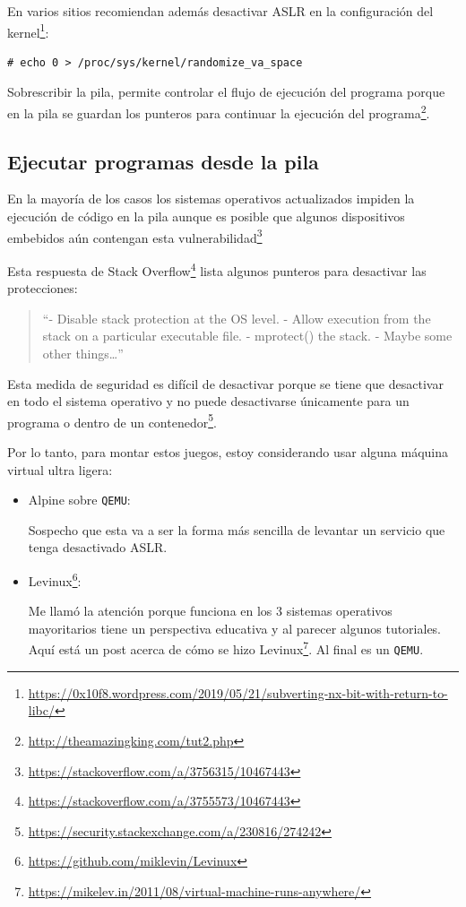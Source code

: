 \documentclass[
  12,
]{scrartcl}
\DeclareRobustCommand{\href}[2]{#2\footnote{\url{#1}}}
\begin{document}
En varios sitios recomiendan además
\href{https://0x10f8.wordpress.com/2019/05/21/subverting-nx-bit-with-return-to-libc/}{desactivar
ASLR en la configuración del kernel}:

\begin{verbatim}
# echo 0 > /proc/sys/kernel/randomize_va_space
\end{verbatim}

Sobrescribir la pila, permite controlar el flujo de ejecución del
programa porque \href{http://theamazingking.com/tut2.php}{en la pila se
guardan los punteros para continuar la ejecución del programa}.

\hypertarget{ejecutar-programas-desde-la-pila}{%
\subsection{Ejecutar programas desde la
pila}\label{ejecutar-programas-desde-la-pila}}

En la mayoría de los casos los sistemas operativos actualizados impiden
la ejecución de código en la pila aunque
\href{https://stackoverflow.com/a/3756315/10467443}{es posible que
algunos dispositivos embebidos aún contengan esta vulnerabilidad}

\href{https://stackoverflow.com/a/3755573/10467443}{Esta respuesta de
Stack Overflow} lista algunos punteros para desactivar las protecciones:

\begin{quote}
``- Disable stack protection at the OS level. - Allow execution from the
stack on a particular executable file. - mprotect() the stack. - Maybe
some other things\ldots{}''
\end{quote}

Esta medida de seguridad es difícil de desactivar porque
\href{https://security.stackexchange.com/a/230816/274242}{se tiene que
desactivar en todo el sistema operativo y no puede desactivarse
únicamente para un programa o dentro de un contenedor}.

Por lo tanto, para montar estos juegos, estoy considerando usar alguna
máquina virtual ultra ligera:

\begin{itemize}
\item
  Alpine sobre \texttt{QEMU}:

  Sospecho que esta va a ser la forma más sencilla de levantar un
  servicio que tenga desactivado ASLR.
\item
  \href{https://github.com/miklevin/Levinux}{Levinux}:

  Me llamó la atención porque funciona en los 3 sistemas operativos
  mayoritarios tiene un perspectiva educativa y al parecer algunos
  tutoriales.
  \href{https://mikelev.in/2011/08/virtual-machine-runs-anywhere/}{Aquí
  está un post acerca de cómo se hizo Levinux}. Al final es un
  \texttt{QEMU}.
\end{itemize}
\end{document}
